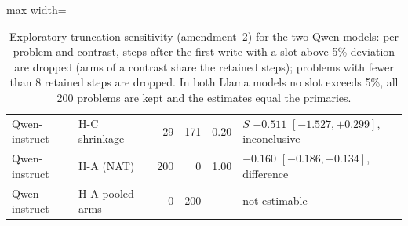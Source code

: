 \begin{table}[!htbp]
\begin{adjustbox}{max width=\linewidth}
\begin{tabular}{@{}l l r r l l@{}}
Qwen-instruct & H-C shrinkage & 29 & 171 & 0.20 & $S$ $-0.511$ $[-1.527, +0.299]$, inconclusive \\
Qwen-instruct & H-A (NAT) & 200 & 0 & 1.00 & $-0.160$ $[-0.186, -0.134]$, difference \\
Qwen-instruct & H-A pooled arms & 0 & 200 & --- & not estimable \\
\bottomrule
\end{tabular}\end{adjustbox}
\caption{Exploratory truncation sensitivity \tagE{} (amendment~2) for the two Qwen models: per problem and contrast, steps after the first write with a slot above 5\% deviation are dropped (arms of a contrast share the retained steps); problems with fewer than 8 retained steps are dropped. In both Llama models no slot exceeds 5\%, all 200 problems are kept and the estimates equal the primaries.}
\label{tab:trunc}
\end{table}
